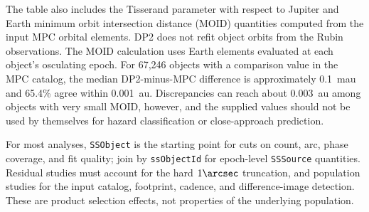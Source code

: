 The table also includes the Tisserand parameter with respect to Jupiter and
Earth minimum orbit intersection distance (MOID) quantities computed from the
input MPC orbital elements.  \gls{DP2} does not refit object orbits from the Rubin
observations.  The MOID calculation uses Earth elements evaluated at each
object's osculating \gls{epoch}.  For 67,246 objects with a comparison value in the
MPC catalog, the median \gls{DP2}-minus-MPC difference is approximately 0.1~mau and
65.4\% agree within 0.001~au.  Discrepancies can reach about 0.003~au among
objects with very small MOID, however, and the supplied values should not be
used by themselves for hazard classification or close-approach prediction.

For most analyses, \texttt{SSObject} is the starting point for cuts on count,
arc, phase coverage, and fit quality; join by \texttt{ssObjectId} for
\gls{epoch}-level \texttt{SSSource} quantities.  Residual studies must account for
the hard $1\arcsec$ truncation, and population studies for the input catalog,
\gls{footprint}, cadence, and difference-image detection.  These are product
selection effects, not properties of the underlying population.
